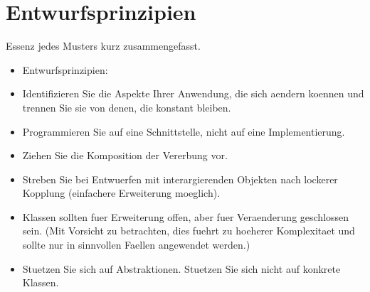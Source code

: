 \section{Entwurfsprinzipien}
Essenz jedes Musters kurz zusammengefasst. 

\begin{itemize}[leftmargin=0.2in]
	\item Entwurfsprinzipien:
	\item Identifizieren Sie die Aspekte Ihrer Anwendung, die sich aendern koennen und trennen Sie sie 
  von denen, die konstant bleiben.
	\item Programmieren Sie auf eine Schnittstelle, nicht auf eine Implementierung.
	\item Ziehen Sie die Komposition der Vererbung vor.
	\item Streben Sie bei Entwuerfen mit interargierenden Objekten nach lockerer Kopplung (einfachere 
Erweiterung moeglich).
	\item Klassen sollten fuer Erweiterung offen, aber fuer Veraenderung geschlossen sein. (Mit Vorsicht zu 
betrachten, dies fuehrt zu hoeherer Komplexitaet und sollte nur in sinnvollen Faellen 
angewendet werden.)
	\item Stuetzen Sie sich auf Abstraktionen. Stuetzen Sie sich nicht auf konkrete Klassen.  
\end{itemize}

	


